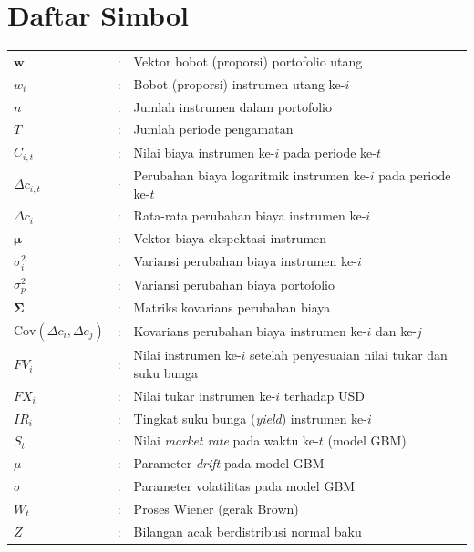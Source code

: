 \chapter*{Daftar Simbol}


\small

\setlength{\LTleft}{0pt}
\setlength{\LTright}{0pt}

\begin{longtable}{p{3.2cm}cp{10.3cm}}

$\mathbf{w}$ & : & Vektor bobot (proporsi) portofolio utang \\
$w_i$ & : & Bobot (proporsi) instrumen utang ke-$i$ \\
$n$ & : & Jumlah instrumen dalam portofolio \\
$T$ & : & Jumlah periode pengamatan \\
$C_{i,t}$ & : & Nilai biaya instrumen ke-$i$ pada periode ke-$t$ \\
$\Delta c_{i,t}$ & : & Perubahan biaya logaritmik instrumen ke-$i$ pada periode ke-$t$ \\
$\overline{\Delta c}_i$ & : & Rata-rata perubahan biaya instrumen ke-$i$ \\
$\boldsymbol{\mu}$ & : & Vektor biaya ekspektasi instrumen \\
$\sigma_i^2$ & : & Variansi perubahan biaya instrumen ke-$i$ \\
$\sigma_p^2$ & : & Variansi perubahan biaya portofolio \\
$\boldsymbol{\Sigma}$ & : & Matriks kovarians perubahan biaya \\
$\mathrm{Cov}(\Delta c_i,\Delta c_j)$ & : & Kovarians perubahan biaya instrumen ke-$i$ dan ke-$j$ \\
$FV_i$ & : & Nilai instrumen ke-$i$ setelah penyesuaian nilai tukar dan suku bunga \\
$FX_i$ & : & Nilai tukar instrumen ke-$i$ terhadap USD \\
$IR_i$ & : & Tingkat suku bunga (\textit{yield}) instrumen ke-$i$ \\
$S_t$ & : & Nilai \textit{market rate} pada waktu ke-$t$ (model GBM) \\
$\mu$ & : & Parameter \textit{drift} pada model GBM \\
$\sigma$ & : & Parameter volatilitas pada model GBM \\
$W_t$ & : & Proses Wiener (gerak Brown) \\
$Z$ & : & Bilangan acak berdistribusi normal baku \\

\end{longtable}
